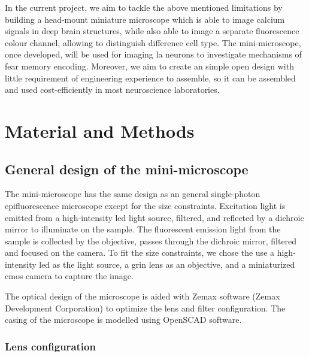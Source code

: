     In the current project, we aim to tackle the above mentioned limitations by building a head-mount miniature microscope which is able to image calcium signals in deep brain structures, while also able to image a separate fluorescence colour channel, allowing to distinguish difference cell type. The mini-microscope, once developed, will be used for imaging \gls{la} neurons to investigate mechanisms of fear memory encoding. Moreover, we aim to create an simple open design with little requirement of engineering experience to assemble, so it can be assembled and used cost-efficiently in most neuroscience laboratories. 

\section{Material and Methods}

\subsection{General design of the mini-microscope}

The mini-microscope has the same design as an general single-photon epifluorescence microscope except for the size constraints. Excitation light is emitted from a high-intensity \gls{led} light source, filtered, and reflected by a dichroic mirror to illuminate on the sample. The fluorescent emission light from the sample is collected by the objective, passes through the dichroic mirror, filtered and focused on the camera. To fit the size constraints, we chose the use a high-intensity \gls{led} as the light source, a \gls{grin} lens as an objective, and a miniaturized \gls{cmos} camera to capture the image.

The optical design of the microscope is aided with Zemax software (Zemax Development Corporation) to optimize the lens and filter configuration. The casing of the microscope is modelled using OpenSCAD software. 

\subsubsection{Lens configuration}

